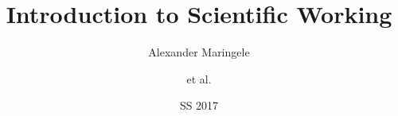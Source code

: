 \documentclass[%
handout,
]{beamer}
\begin{document}
\title{Introduction to Scientific Working}
\author[AxM]{Alexander Maringele\and et al.}
\date{SS 2017}

\titleframe

%



%  
% 
% 
% 

% 
% 
% 
% 
% 
% 
% 
% 
% 


% 
% 
\end{document}
